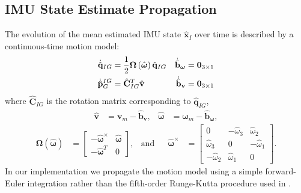 \documentclass[letterpaper, 10 pt, conference]{ieeeconf}  %
\def\Vec#1{\mathbf{#1}}
\newcommand{\bbm}{\begin{bmatrix}}
\newcommand{\ebm}{\end{bmatrix}}
\begin{document}
\subsection{IMU State Estimate Propagation} \label{sec:imu_prop}
The evolution of the mean estimated IMU state $\hat{\Vec{x}}_I$ over time is described by a continuous-time motion model:
\begin{align}
    \dot{\hat{\Vec{q}}}_{IG} &= \frac{1}{2}\boldsymbol{\Omega}\left(\hat{\boldsymbol{\omega}}\right)\hat{\Vec{q}}_{IG} 
        & \dot{\hat{\Vec{b}}}_{\boldsymbol{\omega}}  &= \Vec{0}_{3\times1} \notag \\
    \dot{\hat{\Vec{p}}}^{IG}_G &= \hat{\Vec{C}}_{I G}^T \hat{\Vec{v}}
        & \dot{\hat{\Vec{b}}}_{\Vec{v}} &= \Vec{0}_{3\times1} 
\end{align}
where $\hat{\Vec{C}}_{I G}$ is the rotation matrix corresponding to $\hat{\Vec{q}}_{IG}$,
\begin{align*}
    \hat{\Vec{v}} &= \Vec{v}_m - \hat{\Vec{b}}_{\Vec{v}}, & \hat{\boldsymbol{\omega}} &= \boldsymbol{\omega}_m - \hat{\Vec{b}}_{\boldsymbol{\omega}},
\end{align*}
\begin{align*}
    \boldsymbol{\Omega}\left(\hat{\boldsymbol{\omega}}\right) &= \bbm -\hat{\boldsymbol{\omega}}^\times & \hat{\boldsymbol{\omega}} \\
                                                                -\hat{\boldsymbol{\omega}}^T & 0
                                                            \ebm ,
                                                            & \text{and} &&
    \hat{\boldsymbol{\omega}}^\times &=   \bbm    0 & -\hat{\omega}_3 & \hat{\omega}_2 \\
                                                \hat{\omega}_3 & 0 & -\hat{\omega}_1 \\
                                                -\hat{\omega}_2 & \hat{\omega}_1 & 0
                                            \ebm .
\end{align*}
In our implementation we propagate the motion model using a simple forward-Euler integration rather than the fifth-order Runge-Kutta procedure used in \cite{Mourikis:2007:ICRA}.
\end{document}

